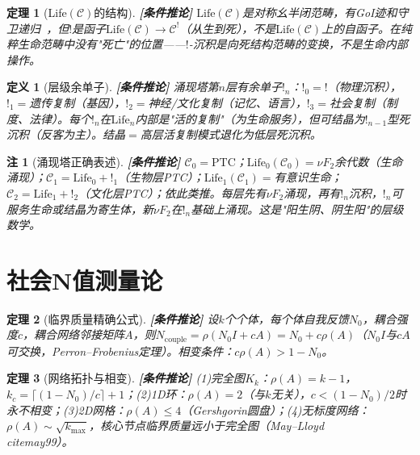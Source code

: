 \documentclass[11pt,a4paper]{article}
\newtheorem{definition}{定义}
\newtheorem{theorem}{定理}
\newtheorem{remark}{注}
\newcommand{\lvl}[1]{\hfill\textbf{\footnotesize[#1]}}
\newcommand{\lvC}{\lvl{条件推论}}
\newcommand{\bang}{{!}}
\begin{document}
\begin{theorem}[Life$(\mathcal{C})$的结构]\label{thm:life-structure}\lvC
$\mathrm{Life}(\mathcal{C})$是对称幺半闭范畴，有GoI迹和守卫递归~\cite{atkey13}，但$\bang$是函子$\mathrm{Life}(\mathcal{C})\to\mathcal{C}^!$（从生到死），不是$\mathrm{Life}(\mathcal{C})$上的自函子。在纯粹生命范畴中没有"死亡"的位置——$\bang$-沉积是向死结构范畴的变换，不是生命内部操作。
\end{theorem}

\begin{definition}[层级余单子]\label{def:hierarchical-comonad}\lvC
涌现塔第$n$层有余单子$\bang_n$：$\bang_0=\bang$（物理沉积），$\bang_1=$遗传复制（基因），$\bang_2=$神经/文化复制（记忆、语言），$\bang_3=$社会复制（制度、法律）。每个$\bang_n$在$\mathrm{Life}_n$内部是"活的复制"（为生命服务），但可结晶为$\bang_{n-1}$型死沉积（反客为主）。结晶$=$高层活复制模式退化为低层死沉积。
\end{definition}

\begin{remark}[涌现塔正确表述]\lvC
$\mathcal{C}_0=\mathrm{PTC}$；$\mathrm{Life}_0(\mathcal{C}_0)=\nu F_2$余代数（生命涌现）；$\mathcal{C}_1=\mathrm{Life}_0+\bang_1$（生物层PTC）；$\mathrm{Life}_1(\mathcal{C}_1)=$有意识生命；$\mathcal{C}_2=\mathrm{Life}_1+\bang_2$（文化层PTC）；依此类推。每层先有$\nu F_2$涌现，再有$\bang_n$沉积，$\bang_n$可服务生命或结晶为寄生体，新$\nu F_2$在$\bang_n$基础上涌现。这是"阳生阴、阴生阳"的层级数学。
\end{remark}


\section{社会N值测量论}

\begin{theorem}[临界质量精确公式]\label{thm:critical-mass-exact}\lvC
设$k$个个体，每个体自我反馈$N_0$，耦合强度$c$，耦合网络邻接矩阵$A$，则$N_{\mathrm{couple}}=\rho(N_0 I+cA)=N_0+c\rho(A)$（$N_0 I$与$cA$可交换，Perron--Frobenius定理）。相变条件：$c\rho(A)>1-N_0$。
\end{theorem}

\begin{theorem}[网络拓扑与相变]\label{thm:topology-transition}\lvC
(1)完全图$K_k$：$\rho(A)=k-1$，$k_c=\lceil(1-N_0)/c\rceil+1$；(2)1D环：$\rho(A)=2$（与$k$无关），$c<(1-N_0)/2$时永不相变；(3)2D网格：$\rho(A)\leq 4$（Gershgorin圆盘）；(4)无标度网络：$\rho(A)\sim\sqrt{k_{\max}}$，核心节点临界质量远小于完全图（May--Lloyd~\\cite{may99}）。
\end{theorem}
\end{document}

